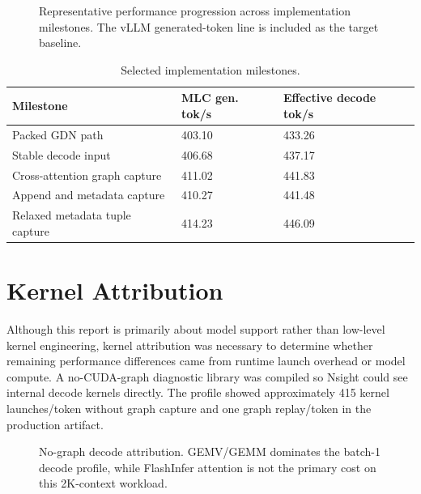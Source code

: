 \documentclass[10pt]{article}
\begin{document}
\begin{figure}[t]
  \centering
  
  \caption{Representative performance progression across implementation
  milestones. The vLLM generated-token line is included as the target baseline.}
  \label{fig:timeline}
\end{figure}

\begin{table}[t]
  \centering
  \caption{Selected implementation milestones.}
  \label{tab:milestones}
  \begin{tabular}{lll}
    \toprule
    Milestone & MLC gen. tok/s & Effective decode tok/s \\
    \midrule
    Packed GDN path & 403.10 & 433.26 \\
    Stable decode input & 406.68 & 437.17 \\
    Cross-attention graph capture & 411.02 & 441.83 \\
    Append and metadata capture & 410.27 & 441.48 \\
    Relaxed metadata tuple capture & 414.23 & 446.09 \\
    \bottomrule
  \end{tabular}
\end{table}

\section{Kernel Attribution}

Although this report is primarily about model support rather than low-level
kernel engineering, kernel attribution was necessary to determine whether
remaining performance differences came from runtime launch overhead or model
compute. A no-CUDA-graph diagnostic library was compiled so Nsight could see
internal decode kernels directly. The profile showed approximately 415 kernel
launches/token without graph capture and one graph replay/token in the
production artifact.

\begin{figure}[t]
  \centering
  
  \caption{No-graph decode attribution. GEMV/GEMM dominates the batch-1 decode
  profile, while FlashInfer attention is not the primary cost on this 2K-context
  workload.}
  \label{fig:kernel-breakdown}
\end{figure}
\end{document}
